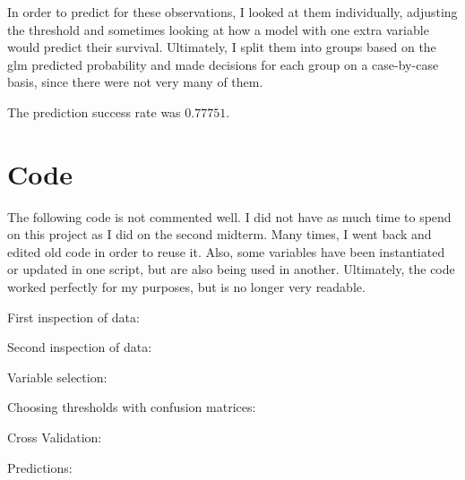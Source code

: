 \documentclass[12pt]{article}
\begin{document}
In order to predict for these observations, I looked at them individually, adjusting the threshold and sometimes looking at how a model with one extra variable would predict their survival.  Ultimately, I split them into groups based on the glm predicted probability and made decisions for each group on a case-by-case basis, since there were not very many of them.

\noindent The prediction success rate was $0.77751$.

\pagebreak
\section{Code}
The following code is not commented well.  I did not have as much time to spend on this project as I did on the second midterm.  Many times, I went back and edited old code in order to reuse it.  Also, some variables have been instantiated or updated in one script, but are also being used in another.  Ultimately, the code worked perfectly for my purposes, but is no longer very readable.

\noindent First inspection of data:

Second inspection of data:

Variable selection:

Choosing thresholds with confusion matrices:

Cross Validation:

Predictions:

\end{document}
